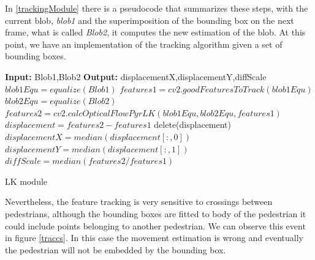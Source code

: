 %
%


In \ref{trackingModule} there is a pseudocode that summarizes these steps, with the current blob, \textit{blob1} and the superimposition of the bounding box on the next frame, what is called \textit{Blob2}, it computes the new estimation of the blob. At this point, we have an implementation of the tracking algorithm given a set of bounding boxes.



\begin{algorithm}
\begin{algorithmic}[1]
\State \textbf{Input:} Blob1,Blob2 
\State \textbf{Output:} displacementX,displacementY,diffScale
\State $blob1Equ = equalize(Blob1)$
\State $features1 = cv2.goodFeaturesToTrack(blob1Equ)$
\State $blob2Equ = equalize(Blob2)$
\State $features2 = cv2.calcOpticalFlowPyrLK(blob1Equ,blob2Equ,features1)$
\State $displacement = features2-features1 $
\State delete(displacement)
\EndIf
\State $displacementX = median(displacement[:,0]) $
\State $displacementY = median(displacement[:,1]) $
\State $diffScale = median(features2/features1) $
\end{algorithmic}
\caption{LK module}\label{trackingModule}
\end{algorithm}


\vspace{2cm}


Nevertheless, the feature tracking is very sensitive to crossings between pedestrians, although the bounding boxes are fitted to body of the pedestrian it could include points belonging to another pedestrian. We can observe this event in figure \ref{traccs}. In this case the movement estimation is wrong and eventually the pedestrian will not be embedded by the bounding box.


